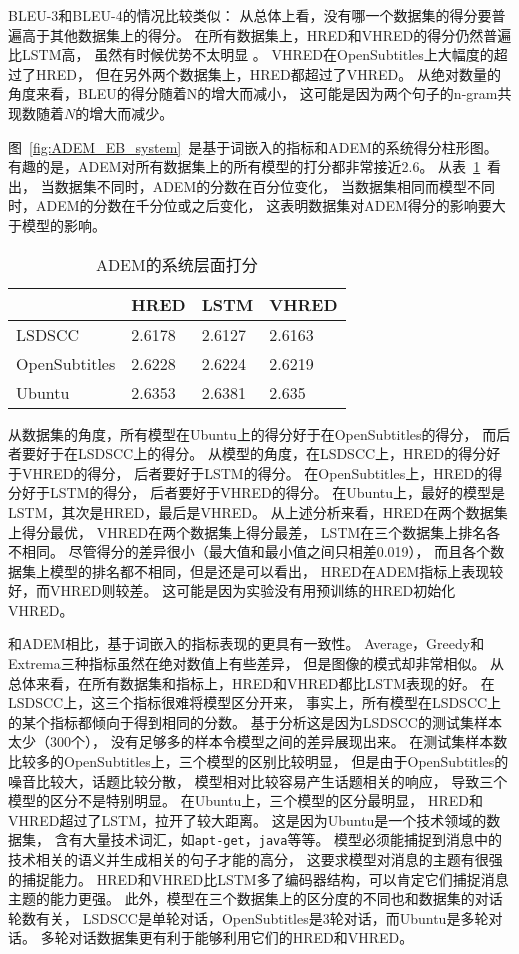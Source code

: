 BLEU-3和BLEU-4的情况比较类似：
从总体上看，没有哪一个数据集的得分要普遍高于其他数据集上的得分。
在所有数据集上，HRED和VHRED的得分仍然普遍比LSTM高，
虽然有时候优势不太明显 。
VHRED在OpenSubtitles上大幅度的超过了HRED，
但在另外两个数据集上，HRED都超过了VHRED。
从绝对数量的角度来看，BLEU的得分随着N的增大而减小，
这可能是因为两个句子的n-gram共现数随着$N$的增大而减少。


图~\ref{fig:ADEM_EB_system}~是基于词嵌入的指标和ADEM的系统得分柱形图。
有趣的是，ADEM对所有数据集上的所有模型的打分都非常接近2.6。
从表~\ref{tab:ADEM_system}~看出，
当数据集不同时，ADEM的分数在百分位变化，
当数据集相同而模型不同时，ADEM的分数在千分位或之后变化，
这表明数据集对ADEM得分的影响要大于模型的影响。
\begin{table}
    \centering
    \caption{ADEM的系统层面打分}
    \label{tab:ADEM_system}
    \begin{tabular}{llll}
        \toprule
        & HRED & LSTM & VHRED \\
        \midrule
        LSDSCC & 2.6178 & 2.6127 & 2.6163  \\
        OpenSubtitles & 2.6228 & 2.6224 & 2.6219 \\
        Ubuntu & 2.6353 & 2.6381 & 2.635 \\
        \bottomrule
    \end{tabular}
\end{table}
从数据集的角度，所有模型在Ubuntu上的得分好于在OpenSubtitles的得分，
而后者要好于在LSDSCC上的得分。
从模型的角度，在LSDSCC上，HRED的得分好于VHRED的得分，
后者要好于LSTM的得分。
在OpenSubtitles上，HRED的得分好于LSTM的得分，
后者要好于VHRED的得分。
在Ubuntu上，最好的模型是LSTM，其次是HRED，最后是VHRED。
从上述分析来看，HRED在两个数据集上得分最优，
VHRED在两个数据集上得分最差，
LSTM在三个数据集上排名各不相同。
尽管得分的差异很小（最大值和最小值之间只相差0.019），
而且各个数据集上模型的排名都不相同，但是还是可以看出，
HRED在ADEM指标上表现较好，而VHRED则较差。
这可能是因为实验没有用预训练的HRED初始化VHRED。


和ADEM相比，基于词嵌入的指标表现的更具有一致性。
Average，Greedy和Extrema三种指标虽然在绝对数值上有些差异，
但是图像的模式却非常相似。
从总体来看，在所有数据集和指标上，HRED和VHRED都比LSTM表现的好。
在LSDSCC上，这三个指标很难将模型区分开来，
事实上，所有模型在LSDSCC上的某个指标都倾向于得到相同的分数。
基于分析这是因为LSDSCC的测试集样本太少（300个），
没有足够多的样本令模型之间的差异展现出来。
在测试集样本数比较多的OpenSubtitles上，三个模型的区别比较明显，
但是由于OpenSubtitles的噪音比较大，话题比较分散，
模型相对比较容易产生话题相关的响应，
导致三个模型的区分不是特别明显。
在Ubuntu上，三个模型的区分最明显，
HRED和VHRED超过了LSTM，拉开了较大距离。
这是因为Ubuntu是一个技术领域的数据集，
含有大量技术词汇，如\texttt{apt-get}，\texttt{java}等等。
模型必须能捕捉到消息中的技术相关的语义并生成相关的句子才能的高分，
这要求模型对消息的主题有很强的捕捉能力。
HRED和VHRED比LSTM多了编码器结构，可以肯定它们捕捉消息主题的能力更强。
此外，模型在三个数据集上的区分度的不同也和数据集的对话轮数有关，
LSDSCC是单轮对话，OpenSubtitles是3轮对话，而Ubuntu是多轮对话。
多轮对话数据集更有利于能够利用它们的HRED和VHRED。

